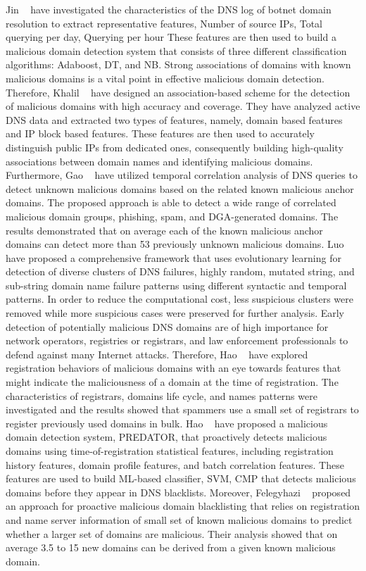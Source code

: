 Jin \etal~ have investigated the characteristics of the DNS log of botnet domain resolution to extract representative features, \eg Number of source IPs, Total querying per day, Querying per hour \etc These features are then used to build a malicious domain detection system that consists of three different classification algorithms: Adaboost, DT, and NB.  
 Strong associations of domains with known malicious domains is a vital point in effective malicious domain detection. Therefore, Khalil \etal~ have designed an association-based scheme for the detection of malicious domains with high accuracy and coverage. They have analyzed active DNS data and extracted two types of features, namely, domain based features and IP block based features. These features are then used to accurately distinguish public IPs from dedicated ones, consequently building high-quality associations between domain names and identifying malicious domains.  
Furthermore, Gao \etal~ have utilized temporal correlation analysis of DNS queries to detect unknown malicious domains based on the related known malicious anchor domains. The proposed approach is able to detect a wide range of correlated malicious domain groups, \eg phishing, spam, and DGA-generated domains. The results demonstrated that on average each of the known malicious anchor domains can detect more than 53 previously unknown malicious domains.
Luo \etal~ have proposed a comprehensive framework that uses evolutionary learning for detection of diverse clusters of DNS failures, \eg highly random, mutated string, and sub-string domain name failure patterns using different syntactic and temporal patterns. In order to reduce the computational cost, less suspicious clusters were removed while more suspicious cases were preserved for further analysis. 
 Early detection of potentially malicious DNS domains are of high importance for network operators, registries or registrars, and law enforcement professionals to defend against many Internet attacks. Therefore, Hao \etal~ have explored registration behaviors of malicious domains with an eye towards features that might indicate the maliciousness of a domain at the time of registration. The characteristics of registrars, domains life cycle, and names patterns were investigated and the results showed that spammers use a small set of registrars to register previously used domains in bulk. 
Hao \etal ~ have proposed a malicious domain detection system, PREDATOR, that proactively detects malicious domains using time-of-registration statistical features, including registration history features, domain profile features, and batch correlation features. These features are used to build ML-based classifier, \eg SVM, CMP that detects malicious domains before they appear in DNS blacklists. Moreover, Felegyhazi \etal~ proposed an approach for proactive malicious domain blacklisting that relies on registration and name server information of small set of known malicious domains to predict whether a larger set of domains are malicious. Their analysis showed that on average 3.5 to 15 new domains can be derived from a given known malicious domain. 
